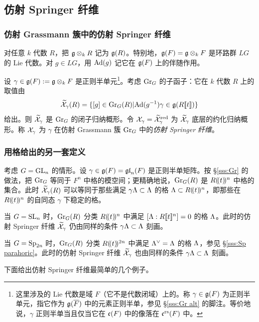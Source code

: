 \subsection{仿射 Springer 纤维}

\subsubsection{仿射 Grassmann 簇中的仿射 Springer 纤维} 对任意 $k$ 代数 $R$，把 $\mathfrak{g}\otimes_{k}R$ 记为 $\mathfrak{g}(R)$。特别地，$\mathfrak{g}(F)=\mathfrak{g}\otimes_{k}F$ 是环路群 $LG$ 的 Lie 代数。对 $g\in LG$，用 $\textup{Ad}(g)$ 记它在 $\mathfrak{g}(F)$ 上的伴随作用。

设 $\gamma\in\mathfrak{g}(F):=\mathfrak{g}\otimes_{k}F$ 是正则半单元\footnote{这里涉及的 Lie 代数是域 $F$（它不是代数闭域）上的。称 $\gamma\in\mathfrak{g}(F)$ 为正则半单元，指它作为 $\mathfrak{g}(\overline{F})$ 中的元素正则半单，参见 \S\ref{sss:Gr alt} 的脚注。等价地说，$\gamma$ 正则半单当且仅当它在 $\mathfrak{c}(F)$ 中的像落在 $\mathfrak{c}^{\textup{rs}}(F)$ 中。}。考虑 $\textup{Gr}_{G}$ 的子函子：它在 $k$ 代数 $R$ 上的取值由
\begin{equation}\label{aff Spr}
\widetilde{\mathcal{X}}_{\gamma}(R)=\{[g]\in \textup{Gr}_{G}(R)|\textup{Ad}(g^{-1})\gamma\in\mathfrak{g}(R[\![t]\!])\}
\end{equation}
给出。则 $\widetilde{\mathcal{X}}_{\gamma}$ 是 $\textup{Gr}_{G}$ 的闭子归纳概形。令 $\mathcal{X}_{\gamma}=\widetilde{\mathcal{X}}^{\textup{red}}_{\gamma}$ 为 $\widetilde{\mathcal{X}}_{\gamma}$ 底层的约化归纳概形。称 $\mathcal{X}_{\gamma}$ 为 $\gamma$ 在仿射 Grassmann 簇 $\textup{Gr}_{G}$ 中的{\em 仿射 Springer 纤维}。

\subsubsection{用格给出的另一套定义}\label{sss:ASF Gr GLn} 考虑 $G=\textup{GL}_{n}$ 的情形。设 $\gamma\in\mathfrak{g}(F)=\mathfrak{gl}_{n}(F)$ 是正则半单矩阵。按 \S\ref{sss:Gr} 的做法，把 $\textup{Gr}_{G}$ 等同于 $F^{n}$ 中格的模空间；更精确地说，$\textup{Gr}_{G}(R)$ 是 $R(\!(t)\!)^{n}$ 中格的集合。此时 $\widetilde{\mathcal{X}}_{\gamma}(R)$ 可以等同于那些满足 $\gamma \Lambda\subset \Lambda$ 的格 $\Lambda\subset R(\!(t)\!)^{n}$，即那些在 $R(\!(t)\!)^{n}$ 的自同态 $\gamma$ 下稳定的格。

当 $G=\textup{SL}_{n}$ 时，$\textup{Gr}_{G}(R)$ 分类 $R(\!(t)\!)^{n}$ 中满足 $[\Lambda:R[\![t]\!]^{n}]=0$ 的格 $\Lambda$。此时的仿射 Springer 纤维 $\widetilde{\mathcal{X}}_{\gamma}$ 仍由同样的条件 $\gamma \Lambda\subset \Lambda$ 刻画。

当 $G=\textup{Sp}_{2n}$ 时，$\textup{Gr}_{G}(R)$ 分类 $R(\!(t)\!)^{2n}$ 中满足 $\Lambda^{\vee}=\Lambda$ 的格 $\Lambda$，参见 \S\ref{sss:Sp parahoric}。此时的仿射 Springer 纤维 $\widetilde{\mathcal{X}}_{\gamma}$ 也由同样的条件 $\gamma \Lambda\subset \Lambda$ 刻画。

下面给出仿射 Springer 纤维最简单的几个例子。

